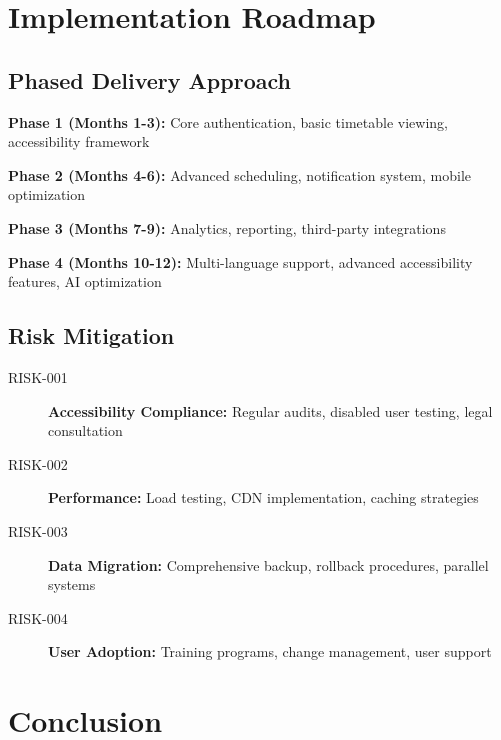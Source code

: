 \documentclass[11pt, a4paper]{article}
\begin{document}
\section{Implementation Roadmap}
\label{sec:implementation}

\subsection{Phased Delivery Approach}
\label{sec:phased_delivery}

\textbf{Phase 1 (Months 1-3):} Core authentication, basic timetable viewing, accessibility framework

\textbf{Phase 2 (Months 4-6):} Advanced scheduling, notification system, mobile optimization

\textbf{Phase 3 (Months 7-9):} Analytics, reporting, third-party integrations

\textbf{Phase 4 (Months 10-12):} Multi-language support, advanced accessibility features, AI optimization

\subsection{Risk Mitigation}
\label{sec:risk_mitigation}

\begin{requirementbox}[title=Risk Management Strategy]
\begin{description}
    \item[RISK-001] \textbf{Accessibility Compliance:} Regular audits, disabled user testing, legal consultation
    \item[RISK-002] \textbf{Performance:} Load testing, CDN implementation, caching strategies
    \item[RISK-003] \textbf{Data Migration:} Comprehensive backup, rollback procedures, parallel systems
    \item[RISK-004] \textbf{User Adoption:} Training programs, change management, user support
\end{description}
\end{requirementbox}

\section{Conclusion}
\label{sec:conclusion}
\end{document}
